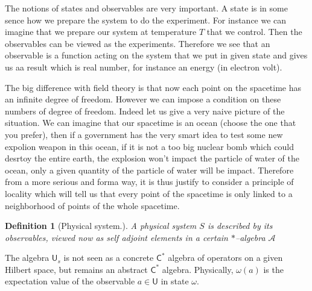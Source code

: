 \documentclass[11pt]{book}
\newcommand{\Acal}{\mathcal{A}}
\newcommand{\Csf}{\mathsf{C}}
\newcommand{\Usf}{\mathsf{U}}
\theoremstyle{break}
\newtheorem{definition}{Definition}[chapter]
\begin{document}
\bigskip


The notions of states and observables are very important. A state is in some sence how we prepare the system to do the experiment. For instance we can imagine that we prepare our system at temperature $T$ that we control. Then the observables can be viewed as the experiments. Therefore we see that an observable is a function acting on the system that we put in given state and gives us aa result which is real number, for instance an energy (in electron volt). 

The big difference with field theory is that now each point on the spacetime has an infinite degree of freedom. However we can impose a condition on these numbers of degree of freedom. Indeed let us give a very naive picture of the situation. We can imagine that our spacetime is an ocean (choose the one that you prefer), then if a government has the very smart idea to test some new expolion weapon in this ocean, if it is not a too big nuclear bomb which could desrtoy the entire earth, the explosion won't impact the particle of water of the ocean, only a given quantity of the particle of water will be impact. Therefore from a more serious and forma way, it is thus justify to consider a principle of locality which will tell us that every point of the spacetime is only linked to a neighborhood of points of the whole spacetime. 



\begin{definition}[Physical system.] 
 A physical system $S$ is described by its observables, viewed now as self adjoint elements in a certain $\ast$--algebra $\Acal$
\end{definition}




The algebra $\Usf_s$ is not seen as a concrete $\Csf^\ast$ algebra of operators on a given Hilbert space, but remains an abstract $\Csf^\ast$ algebra. Physically, $\omega(a)$ is the expectation value of the observable $a \in \Usf$ in state $\omega$.
\end{document}
